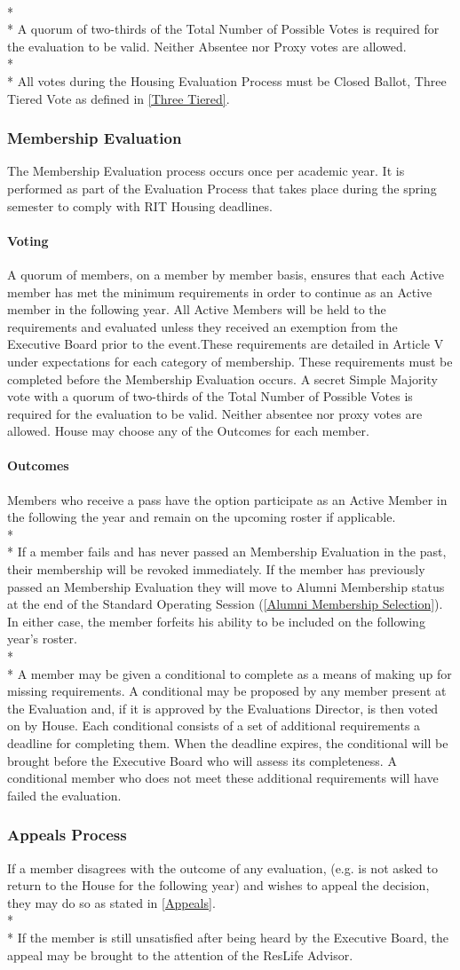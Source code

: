 \documentclass{article}
\newcommand{\bsubsection}[1]{\subsubsection{#1} \label{#1}}
\newcommand{\bsubsubsection}[1]{\paragraph{#1} \label{#1}}
\begin{document}
\\* \\*
A quorum of two-thirds of the Total Number of Possible Votes is required for the evaluation to be valid. Neither Absentee nor Proxy votes are allowed.
\\* \\*
All votes during the Housing Evaluation Process must be Closed Ballot, Three Tiered Vote as defined in \ref{Three Tiered}.
\bsubsection{Membership Evaluation}
The Membership Evaluation process occurs once per academic year. It is performed as part of the Evaluation Process that takes place during the spring semester to comply with RIT Housing deadlines.
\bsubsubsection{Voting} 
A quorum of members, on a member by member basis, ensures that each Active member has met the minimum requirements in order to continue as an Active member in the following year. All Active Members will be held to the requirements and evaluated unless they received an exemption from the Executive Board prior to the event.These requirements are detailed in Article V under expectations for each category of membership. These requirements must be completed before the Membership Evaluation occurs. A secret Simple Majority vote with a quorum of two-thirds of the Total Number of Possible Votes is required for the evaluation to be valid. Neither absentee nor proxy votes are allowed. House may choose any of the Outcomes for each member.
\bsubsubsection{Outcomes}
Members who receive a pass have the option participate as an Active Member in the following the year and remain on the upcoming roster if applicable.
\\* \\*
If a member fails and has never passed an Membership Evaluation in the past, their membership will be revoked immediately. If the member has previously passed an Membership Evaluation they will move to Alumni Membership status at the end of the Standard Operating Session (\ref{Alumni Membership Selection}). In either case, the member forfeits his ability to be included on the following year’s roster.
\\* \\*
A member may be given a conditional to complete as a means of making up for missing requirements. A conditional may be proposed by any member present at the Evaluation and, if it is approved by the Evaluations Director, is then voted on by House. Each conditional consists of a set of additional requirements a deadline for completing them. When the deadline expires, the conditional will be brought before the Executive Board who will assess its completeness. A conditional member who does not meet these additional requirements will have failed the evaluation.
\bsubsection{Appeals Process}
If a member disagrees with the outcome of any evaluation, (e.g. is not asked to return to the House for the following year) and wishes to appeal the decision, they may do so as stated in \ref{Appeals}.
\\* \\*
If the member is still unsatisfied after being heard by the Executive Board, the appeal may be brought to the attention of the ResLife Advisor.
\end{document}
